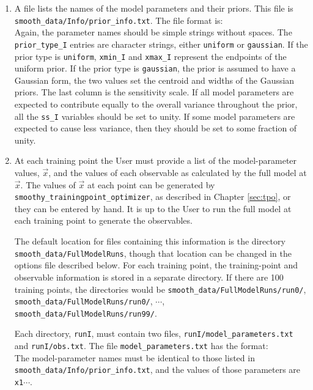 \documentclass[UserManual.tex]{subfiles}
\begin{document}
\begin{sloppypar}
\begin{enumerate}
\item A file lists the names of the model parameters and their priors. This file is {\tt smooth\_data/Info/prior\_info.txt}. The file format is:\\
\vspace*{-8pt}{\tt \begin{Verbatim}[commandchars=\\\{\}]
   parameter_name_1  prior_type_1 xmin_1/centroid_1  xmax_1/Rgauss_1  ss_1
   parameter_name_2  prior_type_2 xmin_2/centroid_2  xmin_2/Rgauss_2  ss_2
   .
   parameter_name_N  prior_type_N xmin_N/centroid_N  xmin_N/Rgauss_N  ss_N
\end{Verbatim}
}\vspace*{-8pt}
Again, the parameter names should be simple strings without spaces. The {\tt prior\_type\_I} entries are character strings, either {\tt uniform} or {\tt gaussian}. If the prior type is {\tt uniform}, {\tt xmin\_I} and {\tt xmax\_I} represent the endpoints of the uniform prior. If the prior type is {\tt gaussian}, the prior is assumed to have a Gaussian form, the two values set the centroid and widths of the Gaussian priors. The last column is the sensitivity scale. If all model parameters are expected to contribute equally to the overall variance throughout the prior, all the {\tt ss\_I} variables should be set to unity. If some model parameters are expected to cause less variance, then they should be set to some fraction of unity. 

\item At each training point the User must provide a list of the model-parameter values, $\vec{x}$, and the values of each observable as calculated by the full model at $\vec{x}$. The values of $\vec{x}$ at each point can be generated by {\tt smoothy\_trainingpoint\_optimizer}, as described in Chapter \ref{sec:tpo}, or they can be entered by hand. It is up to the User to run the full model at each training point to generate the observables.

The default location for files containing this information is the directory {\tt smooth\_data/FullModelRuns}, though that location can be changed in the options file described below. For each training point, the training-point and observable information is stored in a separate directory. If there are 100 training points, the directories would be {\tt smooth\_data/FullModelRuns/run0/}, {\tt smooth\_data/FullModelRuns/run0/}, $\cdots$, {\tt smooth\_data/FullModelRuns/run99/}.

Each directory, {\tt runI}, must contain two files, {\tt runI/model\_parameters.txt} and {\tt runI/obs.txt}. The file {\tt model\_parameters.txt} has the format:\\ 
\vspace*{-8pt}{\tt \begin{Verbatim}[commandchars=\\\{\}]
parameter_name_1 x1  
parameter_name_2 x2  
.
\end{Verbatim}
}\vspace*{-8pt}
The model-parameter names must be identical to those listed in {\tt smooth\_data/Info/prior\_info.txt}, and the values of those parameters are {\tt x1}$\cdots$.


\end{enumerate}
\end{sloppypar}
\end{document}
